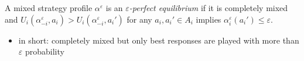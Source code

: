 \documentclass[compress]{beamer}    %
\newcommand{\great}{>}
\theoremstyle{plain}
\theoremstyle{definition}
\begin{document}
{\framebreak

\begin{definition}
  A mixed strategy profile $\alpha^\varepsilon $ is an \emph{$\varepsilon $-perfect equilibrium} if it is completely mixed and $U_i(\alpha_{-i}^\varepsilon ,a_i)\great U_i(\alpha_{-i}^\varepsilon ,a_i')$ for any $a_i,a_i'\in A_i$ implies $\alpha_i^\varepsilon (a_i')\leq \varepsilon $.
\end{definition}

\begin{itemize}
\item in short: completely mixed but only best responses are played with more than $\varepsilon $ probability
\end{itemize}

\framebreak

}
\end{document}
